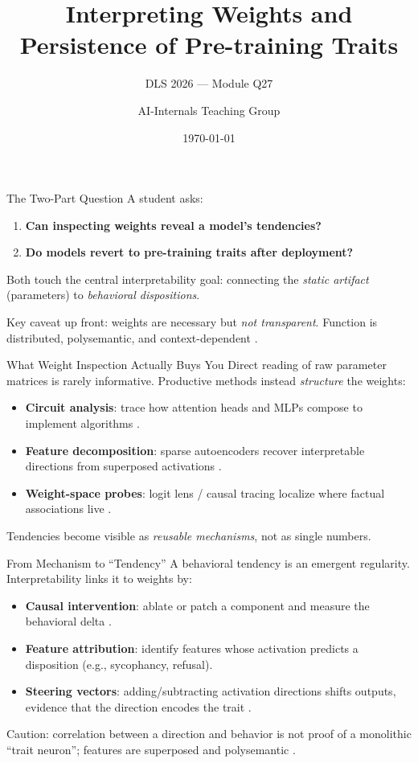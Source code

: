 \documentclass[aspectratio=169,11pt]{beamer}
\title{Interpreting Weights and Persistence of Pre-training Traits}
\subtitle{DLS 2026 --- Module Q27}
\author{AI-Internals Teaching Group}
\date{\today}
\begin{document}
\begin{frame}
  \titlepage
\end{frame}

\begin{frame}{The Two-Part Question}
  A student asks:
  \begin{enumerate}
    \item \textbf{Can inspecting weights reveal a model's tendencies?}
    \item \textbf{Do models revert to pre-training traits after deployment?}
  \end{enumerate}
  \medskip
  Both touch the central interpretability goal: connecting the \emph{static artifact}
  (parameters) to \emph{behavioral dispositions}.
  \medskip

  Key caveat up front: weights are necessary but \emph{not transparent}. Function is
  distributed, polysemantic, and context-dependent \citep{elhage2022superposition,olah2020zoom}.
\end{frame}

\begin{frame}{What Weight Inspection Actually Buys You}
  Direct reading of raw parameter matrices is rarely informative. Productive methods
  instead \emph{structure} the weights:
  \begin{itemize}
    \item \textbf{Circuit analysis}: trace how attention heads and MLPs compose to
      implement algorithms \citep{olsson2022incontext,wang2023ioi}.
    \item \textbf{Feature decomposition}: sparse autoencoders recover
      interpretable directions from superposed activations
      \citep{bricken2023monosemanticity,cunningham2023sparse}.
    \item \textbf{Weight-space probes}: logit lens / causal tracing localize where
      factual associations live \citep{meng2022rome,geva2021keyvalue}.
  \end{itemize}
  Tendencies become visible as \emph{reusable mechanisms}, not as single numbers.
\end{frame}

\begin{frame}{From Mechanism to ``Tendency''}
  A behavioral tendency is an emergent regularity. Interpretability links it to weights by:
  \begin{itemize}
    \item \textbf{Causal intervention}: ablate or patch a component and measure the
      behavioral delta \citep{meng2022rome,wang2023ioi}.
    \item \textbf{Feature attribution}: identify features whose activation predicts a
      disposition (e.g., sycophancy, refusal).
    \item \textbf{Steering vectors}: adding/subtracting activation directions shifts
      outputs, evidence that the direction encodes the trait
      \citep{turner2023steering,zou2023representation}.
  \end{itemize}
  \alert{Caution:} correlation between a direction and behavior is not proof of a
  monolithic ``trait neuron''; features are superposed and polysemantic
  \citep{elhage2022superposition}.
\end{frame}
\end{document}
